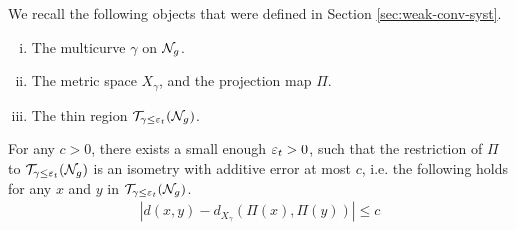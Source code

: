 \documentclass[12pt, reqno]{amsart}
\begin{document}

We recall the following objects that were defined in Section \ref{sec:weak-conv-syst}.

\begin{enumerate}[(i)]
\item The multicurve $\gamma$ on $\mathcal{N}_g$.
\item The metric space $X_\gamma$, and the projection map $\Pi$.
\item The thin region $\mathcal{T}_{\gamma \leq \varepsilon_t}(\mathcal{N}_g)$.
\end{enumerate}

\begin{theorem}
  \label{thm:prno}
  For any $c >0$, there exists a small enough $\varepsilon_t > 0$, such that the restriction of $\Pi$ to $\mathcal{T}_{\gamma \leq \varepsilon_t}(\mathcal{N}_g)$ is an isometry with additive error at most $c$, i.e. the following holds for any $x$ and $y$ in $\mathcal{T}_{\gamma \leq \varepsilon_t}(\mathcal{N}_g)$.
  \begin{align*}
    \left| d(x, y) - d_{X_{\gamma}}(\Pi(x), \Pi(y)) \right| \leq c
  \end{align*}
\end{theorem}
\end{document}
